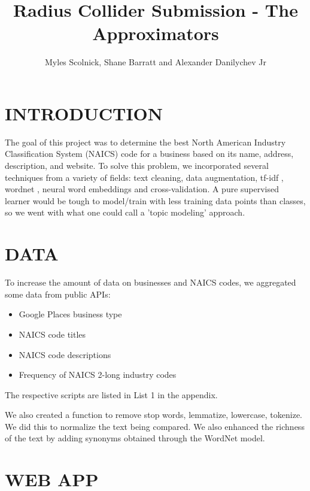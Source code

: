 \documentclass[letterpaper, 10 pt, conference]{IEEEtran}
\title{\LARGE \bf
Radius Collider Submission - The Approximators
}
\author{Myles Scolnick, Shane Barratt and Alexander Danilychev Jr%
}
\begin{document}
\maketitle
\thispagestyle{empty}
\pagestyle{empty}






\section{INTRODUCTION}

The goal of this project was to determine the best North American Industry Classification System (NAICS) code for a business based on its name, address, description, and website. To solve this problem, we incorporated several techniques from a variety of fields: text cleaning, data augmentation, tf-idf \cite{tfidf}, wordnet \cite{wordnet}, neural word embeddings \cite{neural} and cross-validation. A pure supervised learner would be tough to model/train with less training data points than classes, so we went with what one could call a 'topic modeling' approach.

\section{DATA}

To increase the amount of data on businesses and NAICS codes, we aggregated some data from public APIs:
\begin{itemize}
\item Google Places business type
\item NAICS code titles
\item NAICS code descriptions
\item Frequency of NAICS 2-long industry codes
\end{itemize}
The respective scripts are listed in List 1 in the appendix.

We also created a function to remove stop words, lemmatize, lowercase, tokenize. We did this to normalize the text being compared. We also enhanced the richness of the text by adding synonyms obtained through the WordNet model.

\section{WEB APP}
\end{document}
